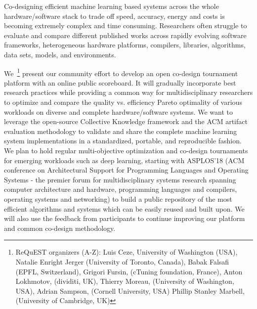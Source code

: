 Co-designing efficient machine learning based systems across
the whole hardware/software stack to trade off speed, accuracy, energy
and costs is becoming extremely complex and time consuming.
%
Researchers often struggle to evaluate and compare different
published works across rapidly evolving software
frameworks, heterogeneous hardware platforms, compilers,
libraries, algorithms, data sets, models, and environments.

We~\footnote{ReQuEST organizers (A-Z): 
Luis Ceze, University of Washington (USA),
Natalie Enright Jerger (University of Toronto, Canada),
Babak Falsafi (EPFL, Switzerland),
Grigori Fursin, (cTuning foundation, France),
Anton Lokhmotov, (dividiti, UK),
Thierry Moreau, (University of Washington, USA),
Adrian Sampson, (Cornell University, USA)
Phillip Stanley Marbell, (University of Cambridge, UK)}
present our community effort to develop an open co-design tournament 
platform with an online public scoreboard.
%
It will gradually incorporate best research practices 
while providing a common way for multidisciplinary researchers
to optimize and compare the quality vs. efficiency Pareto
optimality of various workloads on diverse and complete
hardware/software systems.
%
We want to leverage the open-source Collective Knowledge framework
and the ACM artifact evaluation methodology to validate and share the complete 
machine learning system implementations
in a standardized, portable, and reproducible fashion.
%
We plan to hold regular multi-objective optimization and co-design tournaments 
for emerging workloads such as deep learning, starting with ASPLOS'18
(ACM conference on Architectural Support for Programming Languages and Operating Systems 
- the premier forum for multidisciplinary systems research spanning computer architecture 
and hardware, programming languages and compilers, operating systems and networking)
to build a public repository of the most efficient algorithms and systems
which can be easily reused and built upon.
%
We will also use the feedback from participants to continue improving
our platform and common co-design methodology.

